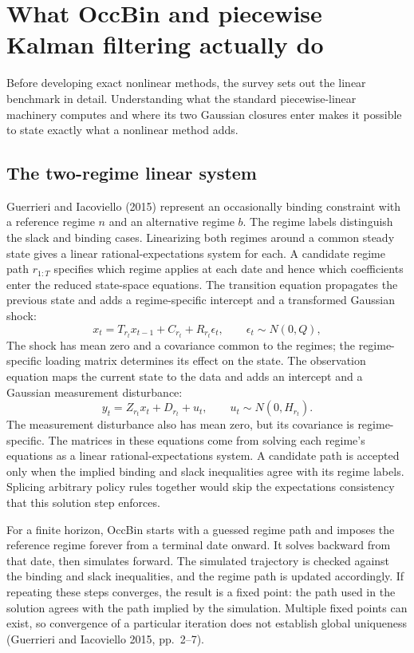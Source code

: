 \documentclass[11pt]{article}
\begin{document}
\section{What OccBin and piecewise Kalman filtering actually do}\label{sec:linear}

Before developing exact nonlinear methods, the survey sets out the linear benchmark in detail. Understanding what the standard piecewise-linear machinery computes and where its two Gaussian closures enter makes it possible to state exactly what a nonlinear method adds.

\subsection{The two-regime linear system}\label{sec:linear-tworegime}

Guerrieri and Iacoviello (2015) represent an occasionally binding constraint with a reference regime \(n\) and an alternative regime \(b\). The regime labels distinguish the slack and binding cases. Linearizing both regimes around a common steady state gives a linear rational-expectations system for each. A candidate regime path \(r_{1:T}\) specifies which regime applies at each date and hence which coefficients enter the reduced state-space equations. The transition equation propagates the previous state and adds a regime-specific intercept and a transformed Gaussian shock:
\begin{equation}\label{eq:6}
 x_t=T_{r_t}x_{t-1}+C_{r_t}+R_{r_t}\epsilon_t,
 \qquad \epsilon_t\sim N(0,Q),
\end{equation}
The shock has mean zero and a covariance common to the regimes; the regime-specific loading matrix determines its effect on the state. The observation equation maps the current state to the data and adds an intercept and a Gaussian measurement disturbance:
\begin{equation}\label{eq:7}
 y_t=Z_{r_t}x_t+D_{r_t}+u_t,
 \qquad u_t\sim N(0,H_{r_t}).
\end{equation}
The measurement disturbance also has mean zero, but its covariance is regime-specific. The matrices in these equations come from solving each regime's equations as a linear rational-expectations system. A candidate path is accepted only when the implied binding and slack inequalities agree with its regime labels. Splicing arbitrary policy rules together would skip the expectations consistency that this solution step enforces.

For a finite horizon, OccBin starts with a guessed regime path and imposes the reference regime forever from a terminal date onward. It solves backward from that date, then simulates forward. The simulated trajectory is checked against the binding and slack inequalities, and the regime path is updated accordingly. If repeating these steps converges, the result is a fixed point: the path used in the solution agrees with the path implied by the simulation. Multiple fixed points can exist, so convergence of a particular iteration does not establish global uniqueness (Guerrieri and Iacoviello 2015, pp.~2--7).
\end{document}
